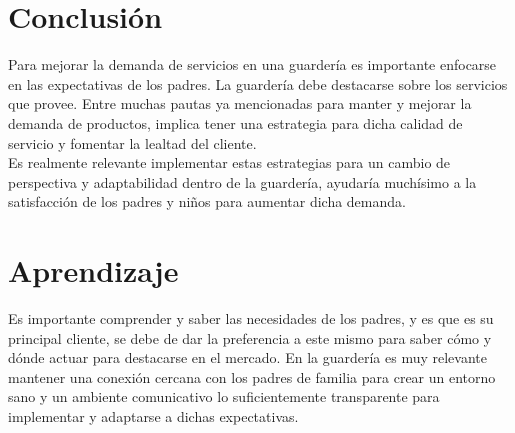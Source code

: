 \documentclass[letterpaper,12pt]{article}
\begin{document}
\begin{sloppypar}
\section{Conclusión}
Para mejorar la demanda de servicios en una guardería es importante
enfocarse en las expectativas de los padres. La guardería debe destacarse sobre los servicios que provee. Entre muchas pautas ya mencionadas para manter y mejorar la demanda de productos, implica tener una estrategia para dicha calidad de servicio y fomentar la lealtad del cliente. 
\vspace{0.3cm}\\ 
Es realmente relevante implementar estas estrategias para un cambio de perspectiva y adaptabilidad dentro de la guardería, ayudaría muchísimo a la satisfacción de los padres y niños para aumentar dicha demanda.

\section{Aprendizaje}
Es importante comprender y saber las necesidades de los padres, y es que es su principal cliente, se debe de dar la preferencia a este mismo para saber cómo y dónde actuar para destacarse en el mercado. En la guardería es muy relevante mantener una conexión cercana con los padres de familia para crear un entorno sano y un ambiente comunicativo lo suficientemente transparente para implementar y adaptarse a dichas expectativas.

\end{sloppypar}
\end{document}
